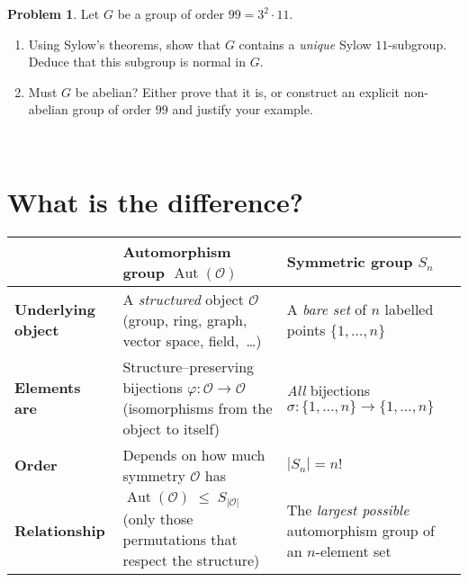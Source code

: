 \documentclass[12pt]{article}
\DeclareMathOperator{\Aut}{Aut}
\theoremstyle{definition} %
\newtheorem{problem}{Problem}
\theoremstyle{plain} %
\begin{document}
    \begin{problem}
      Let \(G\) be a group of order \(99 = 3^{2}\cdot 11\).
    
      \begin{enumerate}[label=\textbf{(\alph*)}]
          \item Using Sylow’s theorems, show that \(G\) contains a \emph{unique}
                Sylow \(11\)-subgroup.  Deduce that this subgroup is normal in \(G\).
                
          \item Must \(G\) be abelian?  Either prove that it is, or construct
                an explicit non-abelian group of order \(99\) and justify your example.
      \end{enumerate}
    \end{problem} 

\section*{What is the difference?}

\begin{center}
\renewcommand{\arraystretch}{1.25}
\begin{tabular}{|p{4.3cm}|p{4.6cm}|p{4.6cm}|}
\hline
            & \textbf{Automorphism group} $\displaystyle\Aut(\mathcal O)$
            & \textbf{Symmetric group} $\displaystyle S_{n}$ \\ \hline\hline
\textbf{Underlying object} 
            & A \emph{structured} object $\mathcal O$  
              (group, ring, graph, vector space, field,~…) 
            & A \emph{bare set} of $n$ labelled points 
              $\{1,\dots ,n\}$ \\ \hline
\textbf{Elements are} 
            & Structure–preserving bijections  
              $\varphi:\mathcal O\to\mathcal O$  
              (isomorphisms from the object to itself)
            & \emph{All} bijections  
              $\sigma:\{1,\dots ,n\}\to\{1,\dots ,n\}$ \\ \hline
\textbf{Order} 
            & Depends on how much symmetry $\mathcal O$ has
            & $|S_{n}|=n!$ \\ \hline
\textbf{Relationship} 
            & $\displaystyle\Aut(\mathcal O)\;\le\;S_{|\mathcal O|}$ \newline
              (only those permutations that respect the structure)
            & The \emph{largest possible} automorphism group of an
              $n$-element set \\ \hline
\end{tabular}
\end{center}
\end{document}
